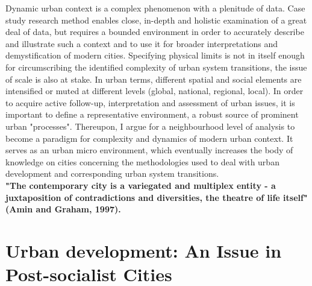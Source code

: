 \documentclass[11pt]{report}
\begin{document}
Dynamic urban context is a complex phenomenon with a plenitude of data. Case study research method enables close, in-depth and holistic examination of a great deal of data, but requires a bounded environment in order to accurately describe and illustrate such a context and to use it for broader interpretations and demystification of modern cities. Specifying physical limits is not in itself enough for circumscribing the identified complexity of urban system transitions, the issue of scale is also at stake. In urban terms, different spatial and social elements are intensified or muted at different levels (global, national, regional, local). In order to acquire active follow-up, interpretation and assessment of urban issues, it is important to define a representative environment, a robust source of prominent urban "processes". Thereupon, I argue for a neighbourhood level of analysis to become a paradigm for complexity and dynamics of modern urban context. It serves as an urban micro environment, which eventually increases the body of knowledge on cities concerning the methodologies used to deal with urban development and corresponding urban system transitions.
\\
\textbf{"The contemporary city is a variegated and multiplex entity - a juxtaposition of contradictions and diversities, the theatre of life itself" (Amin and Graham, 1997).}

\section{Urban development: An Issue in Post-socialist Cities}
\end{document}
